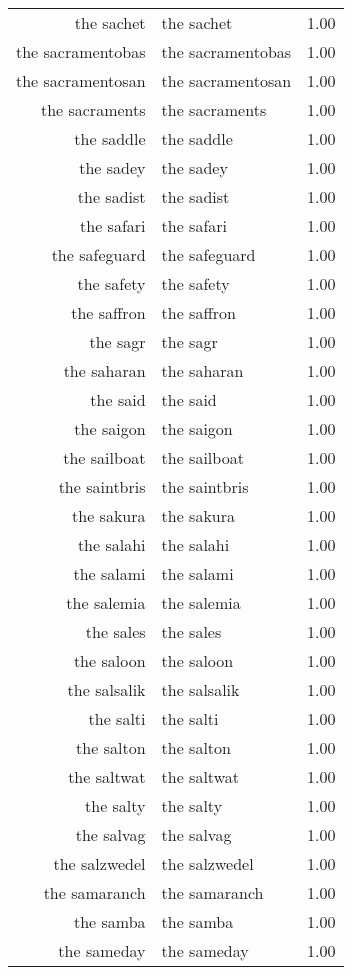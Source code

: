 \begin{table}[ht]
\begin{tabular}{rlr}
  the sachet & the sachet & 1.00 \\ 
  the sacramentobas & the sacramentobas & 1.00 \\ 
  the sacramentosan & the sacramentosan & 1.00 \\ 
  the sacraments & the sacraments & 1.00 \\ 
  the saddle & the saddle & 1.00 \\ 
  the sadey & the sadey & 1.00 \\ 
  the sadist & the sadist & 1.00 \\ 
  the safari & the safari & 1.00 \\ 
  the safeguard & the safeguard & 1.00 \\ 
  the safety & the safety & 1.00 \\ 
  the saffron & the saffron & 1.00 \\ 
  the sagr & the sagr & 1.00 \\ 
  the saharan & the saharan & 1.00 \\ 
  the said & the said & 1.00 \\ 
  the saigon & the saigon & 1.00 \\ 
  the sailboat & the sailboat & 1.00 \\ 
  the saintbris & the saintbris & 1.00 \\ 
  the sakura & the sakura & 1.00 \\ 
  the salahi & the salahi & 1.00 \\ 
  the salami & the salami & 1.00 \\ 
  the salemia & the salemia & 1.00 \\ 
  the sales & the sales & 1.00 \\ 
  the saloon & the saloon & 1.00 \\ 
  the salsalik & the salsalik & 1.00 \\ 
  the salti & the salti & 1.00 \\ 
  the salton & the salton & 1.00 \\ 
  the saltwat & the saltwat & 1.00 \\ 
  the salty & the salty & 1.00 \\ 
  the salvag & the salvag & 1.00 \\ 
  the salzwedel & the salzwedel & 1.00 \\ 
  the samaranch & the samaranch & 1.00 \\ 
  the samba & the samba & 1.00 \\ 
  the sameday & the sameday & 1.00 \\ 

\end{tabular}
\end{table}
